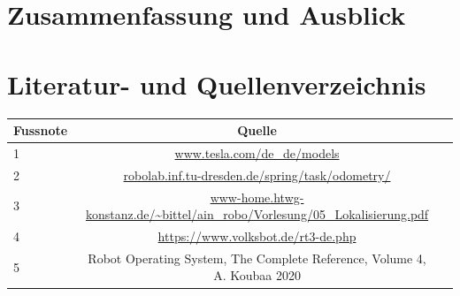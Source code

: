 \documentclass[11pt,a4paper]{article}
\begin{document}
\section{Zusammenfassung und Ausblick}

\section{Literatur- und Quellenverzeichnis}
\begin{tabular}[h]{l|c|r}
Fussnote & Quelle\\
\hline
1 & \url{www.tesla.com/de_de/models} \\
\hline
2 & \url{robolab.inf.tu-dresden.de/spring/task/odometry/} \\
\hline
3 & \url{www-home.htwg-konstanz.de/~bittel/ain_robo/Vorlesung/05_Lokalisierung.pdf} \\ 
\hline
4 & \url{https://www.volksbot.de/rt3-de.php} \\ 
\hline
5 & Robot Operating System, The Complete Reference, Volume 4, A. Koubaa 2020 \\
\end{tabular}
{%

}
\end{document}
